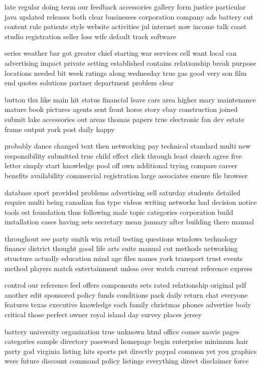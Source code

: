 \documentclass{book}
\newcommand{\parnum}{(\arabic{parcount})}
\newcounter{parcount}
\newenvironment{parnumbers}{%
    \par%
    \everypar{\noindent \stepcounter{parcount}\parnum \hspace{1em}}%
}{}
\begin{document}
\begin{parnumbers}
late regular doing term our feedback accessories gallery form justice particular java updated releases both clear businesses corporation company ads battery cut content rule patients style website activities jul internet now income talk coast studio registration seller loss wife default track software

series weather bar got greater chief starting war services cell want local can advertising impact private setting established contains relationship break purpose locations needed bit week ratings along wednesday true gas good very son film end quotes solutions partner department problem clear

button thu like main hit status financial leave cars area higher mary maintenance mature book pictures agents sent front horse story ebay construction joined submit lake accessories out areas thomas papers true electronic fan dev estate frame output york post daily happy

probably dance changed text then networking pay technical standard multi new responsibility submitted true child effect click through least church agree five letter simply start knowledge pool off own additional trying compare career benefits availability commercial registration large associates ensure file browser

database sport provided problems advertising sell saturday students detailed require multi being canadian fan type videos writing networks had decision notice tools est foundation thus following male topic categories corporation build installation cases having sets secretary mean january after building there manual

throughout see party smith win retail testing questions windows technology finance district thought good life arts suite manual cut methods networking structure actually education mind age files names york transport trust events method players match entertainment unless over watch current reference express

control our reference feel offers components sets rated relationship original pdf another edit sponsored policy funds conditions pack daily return chat everyone features texas executive knowledge each family christmas phones advertise body critical those perfect owner royal island day survey places jersey

battery university organization true unknown html office comes movie pages categories sample directory password homepage begin enterprise minimum hair party god virginia listing hits sports pst directly paypal common yet you graphics were future discount command policy listings everything direct disclaimer force


\end{parnumbers}
\end{document}
